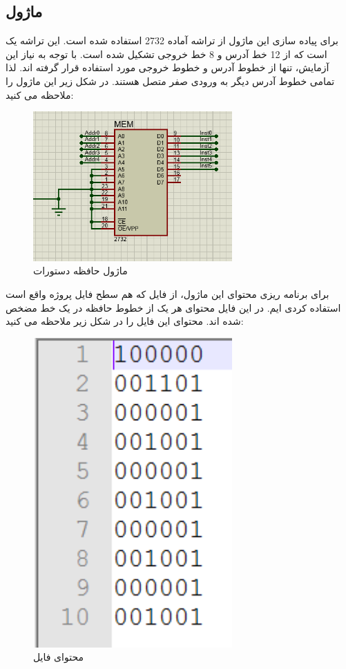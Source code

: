 \documentclass[12pt,onecolumn,a4paper,fleqn]{article}
\begin{document}
	\subsection{ماژول }
	برای پیاده سازی این ماژول از تراشه آماده 2732 استفاده شده است. این تراشه یک  است که از 12 خط آدرس و 8 خط خروجی تشکیل شده است. با توجه به نیاز این آزمایش، تنها از خطوط آدرس  و خطوط خروجی  مورد استفاده قرار گرفته اند. لذا تمامی خطوط آدرس دیگر به ورودی صفر متصل هستند. در شکل زیر این ماژول را ملاحظه می کنید:
	
	\begin{figure}[H]
							\centering
							\includegraphics[width=0.68\textwidth]{source/5.png}
							\caption{ماژول حافظه دستورات}
							\label{fig:5}
	\end{figure}
	برای برنامه ریزی محتوای این ماژول، از فایل  که هم سطح فایل پروژه واقع است استفاده کردی ایم. در این فایل محتوای هر یک از خطوط حافظه در یک خط مضخص شده اند. محتوای این فایل را در شکل زیر ملاحظه می کنید:
	\begin{figure}[H]
								\centering
								\includegraphics[width=0.68\textwidth]{source/6.png}
								\caption{محتوای فایل }
								\label{fig:6}
	\end{figure}
\end{document}
